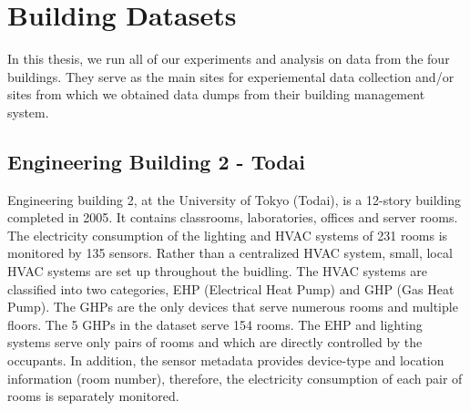 \section{Building Datasets}

In this thesis, we run all of our experiments and analysis on data from the four buildings.  They serve as 
the main sites for experiemental data collection and/or sites from which we obtained data dumps from their building
management system.




\subsection{Engineering Building 2 - Todai}\label{data:engbldg2}
Engineering building 2, at the University of Tokyo (Todai), is a 12-story building completed in 2005.  It contains
classrooms, laboratories, offices and server rooms.  
The electricity consumption of the lighting and HVAC systems of 231 rooms is monitored by 135 sensors.
Rather than a centralized HVAC system, small, local HVAC systems are set up throughout the buidling.  
The HVAC systems are classified into two categories, EHP (Electrical Heat Pump) and GHP (Gas Heat Pump).
The GHPs are the only devices that serve numerous rooms and multiple floors.  The 5 GHPs in the dataset serve 154 rooms.
The EHP and lighting systems serve only pairs of rooms and which are directly controlled by the occupants.
In addition, the sensor metadata provides device-type and location information (room number), 
therefore, the electricity consumption of each pair of rooms is separately monitored.


